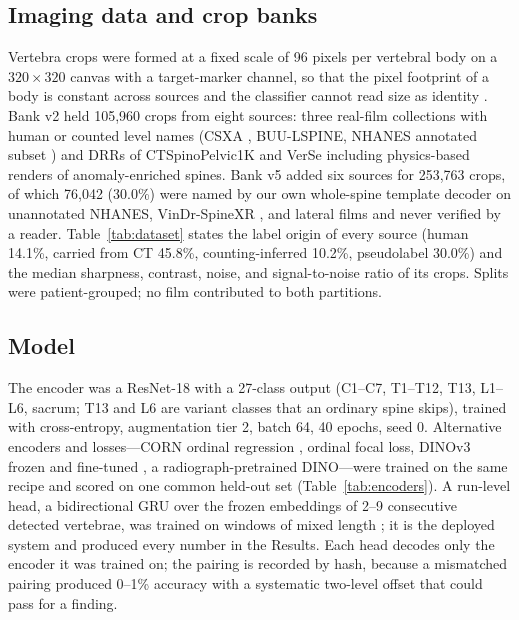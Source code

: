 \documentclass[11pt,letterpaper]{article}
\begin{document}
\subsection*{Imaging data and crop banks}
Vertebra crops were formed at a fixed scale of 96 pixels per vertebral body on a $320\times320$ canvas with a target-marker channel, so that the pixel footprint of a body is constant across sources and the classifier cannot read size as identity \citep{schwing2026ctx}. Bank v2 held 105,960 crops from eight sources: three real-film collections with human or counted level names (CSXA \citep{csxa}, BUU-LSPINE, NHANES annotated subset \citep{nhanes}) and DRRs of CTSpinoPelvic1K and VerSe including physics-based renders of anomaly-enriched spines. Bank v5 added six sources for 253,763 crops, of which 76,042 (30.0\%) were named by our own whole-spine template decoder on unannotated NHANES, VinDr-SpineXR \citep{vindr}, and lateral films and never verified by a reader. Table~\ref{tab:dataset} states the label origin of every source (human 14.1\%, carried from CT 45.8\%, counting-inferred 10.2\%, pseudolabel 30.0\%) and the median sharpness, contrast, noise, and signal-to-noise ratio of its crops. Splits were patient-grouped; no film contributed to both partitions.

\subsection*{Model}
The encoder was a ResNet-18 \citep{he2016} with a 27-class output (C1--C7, T1--T12, T13, L1--L6, sacrum; T13 and L6 are variant classes that an ordinary spine skips), trained with cross-entropy, augmentation tier 2, batch 64, 40 epochs, seed 0. Alternative encoders and losses---CORN ordinal regression \citep{corn2023}, ordinal focal loss, DINOv3 frozen and fine-tuned \citep{dinov3}, a radiograph-pretrained DINO---were trained on the same recipe and scored on one common held-out set (Table~\ref{tab:encoders}). A run-level head, a bidirectional GRU over the frozen embeddings of 2--9 consecutive detected vertebrae, was trained on windows of mixed length \citep{schwing2026mixed}; it is the deployed system and produced every number in the Results. Each head decodes only the encoder it was trained on; the pairing is recorded by hash, because a mismatched pairing produced 0--1\% accuracy with a systematic two-level offset that could pass for a finding.
\end{document}
